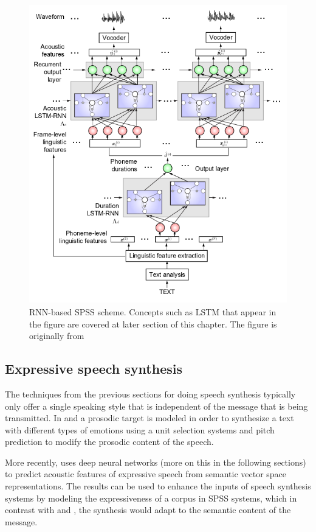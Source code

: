 \begin{figure}[h]
\centering
    \includegraphics[height=13cm]{figures/rnn-tts}
    \caption{RNN-based SPSS scheme. Concepts such as LSTM that appear in the figure are covered at later section of this chapter. The figure is originally from \cite{chen1998rnn}}
    \label{fig:rnn-tts-0}
\end{figure}

\subsection{Expressive speech synthesis}

The techniques from the previous sections for doing speech synthesis typically only offer a single speaking style that is independent of the message that is being transmitted. In \cite{bulut2002expressive} and \cite{eide2004corpus} a prosodic target is modeled in order to synthesize a text with different types of emotions using a unit selection systems and pitch prediction to modify the prosodic content of the speech.

More recently, \cite{jauk2016acoustic} uses deep neural networks (more on this in the following sections) to predict acoustic features of expressive speech from semantic vector space representations. The results can be used to enhance the inputs of speech synthesis systems by modeling the expressiveness of a corpus in SPSS systems, which in contrast with \cite{bulut2002expressive} and \cite{eide2004corpus}, the synthesis would adapt to the semantic content of the message.

